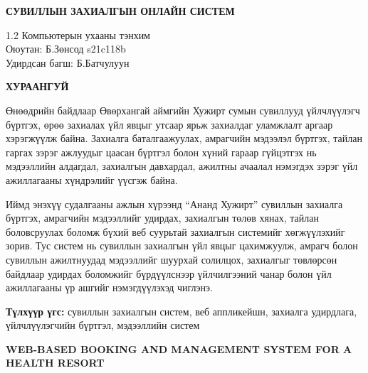 \newpage
{}
{}
\begin{center}
    \textbf{\large \MakeUppercase{Сувиллын захиалгын онлайн систем}}\\[0.2cm]
\end{center}

\vspace{0.5cm}

\begin{flushright}
    \begin{spacing}{1.2}
        {\normalsize Компьютерын ухааны тэнхим}\\
        {\normalsize Оюутан: Б.Зөнсод s21c118b}\\
        {\normalsize Удирдсан багш: Б.Батчулуун}
    \end{spacing}
\end{flushright}

\vspace{0.5cm}

\begin{center}
    \textbf{\MakeUppercase{Хураангуй}}
\end{center}

\vspace{0.3cm}

Өнөөдрийн байдлаар Өвөрхангай аймгийн Хужирт сумын сувиллууд үйлчлүүлэгч бүртгэх, өрөө захиалах үйл явцыг утсаар ярьж захиалдаг уламжлалт аргаар хэрэгжүүлж байна.
Захиалга баталгаажуулах, амрагчийн мэдээлэл бүртгэх, тайлан гаргах зэрэг ажлуудыг цаасан бүртгэл болон хүний гараар гүйцэтгэх нь мэдээллийн алдагдал, захиалгын давхардал, ажилтны ачаалал нэмэгдэх зэрэг үйл ажиллагааны хүндрэлийг үүсгэж байна.

Иймд энэхүү судалгааны ажлын хүрээнд “Ананд Хужирт” сувиллын захиалга бүртгэх, амрагчийн мэдээллийг удирдах, захиалгын төлөв хянах, тайлан боловсруулах боломж бүхий веб суурьтай захиалгын системийг хөгжүүлэхийг зорив. Тус систем нь сувиллын захиалгын үйл явцыг цахимжуулж, амрагч болон сувиллын ажилтнуудад мэдээллийг шуурхай солилцох, захиалгыг төвлөрсөн байдлаар удирдах боломжийг бүрдүүлснээр үйлчилгээний чанар болон үйл ажиллагааны үр ашгийг нэмэгдүүлэхэд чиглэнэ.

\vspace{1cm}

\noindent \textbf{Түлхүүр үгс:} сувиллын захиалгын систем, веб аппликейшн, захиалга удирдлага, үйлчлүүлэгчийн бүртгэл, мэдээллийн систем

\newpage
{}
\begin{center}
    \textbf{\large \MakeUppercase{Web-based booking and management system for a health resort}}\\[0.2cm]
\end{center}

